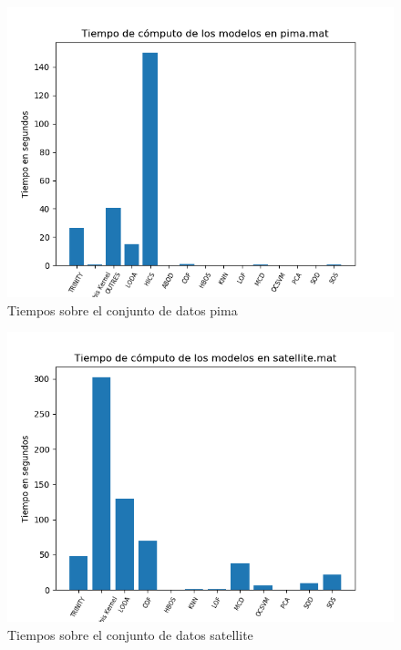 \begin{figure}[H]
	\centering
	\includegraphics[scale=0.7]{imagenes/imgs-exp1/times/pima}
	\caption{Tiempos sobre el conjunto de datos pima}
	\label{pima_times}
\end{figure}

\begin{figure}[H]
	\centering
	\includegraphics[scale=0.7]{imagenes/imgs-exp1/times/satellite}
	\caption{Tiempos sobre el conjunto de datos satellite}
	\label{satellite_times}
\end{figure}

